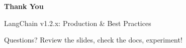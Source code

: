 \documentclass[aspectratio=169,11pt]{beamer}
\begin{document}
\begin{frame}
\vspace{3cm}

\Huge \textbf{Thank You}

\vspace{1em}

\Large LangChain v1.2.x: Production \& Best Practices

\vspace{1em}

\small Questions? Review the slides, check the docs, experiment!

\end{frame}
\end{document}
